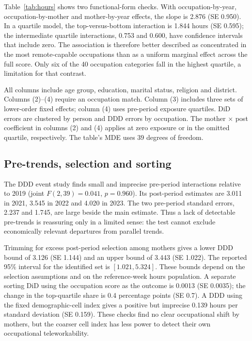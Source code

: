 \documentclass[12pt,a4paper]{article}
\begin{document}
Table~\ref{tab:hours} shows two functional-form checks. With occupation-by-year, occupation-by-mother and mother-by-year effects, the slope is 2.876 (SE 0.950). In a quartile model, the top-versus-bottom interaction is 1.844 hours (SE 0.595); the intermediate quartile interactions, 0.753 and 0.600, have confidence intervals that include zero. The association is therefore better described as concentrated in the most remote-capable occupations than as a uniform marginal effect across the full score. Only six of the 40 occupation categories fall in the highest quartile, a limitation for that contrast.

\begin{table}[htbp]\centering\begin{threeparttable}
\caption{Weekly-hours DiD and occupational-exposure DDD}\label{tab:hours}
\renewcommand{\baselinestretch}{1}\scriptsize\setlength{\tabcolsep}{3pt}

\begin{tablenotes}\footnotesize\item All columns include age group, education, marital status, religion and district. Columns (2)--(4) require an occupation match. Column (3) includes three sets of lower-order fixed effects; column (4) uses pre-period exposure quartiles. DiD errors are clustered by person and DDD errors by occupation. The mother $\times$ post coefficient in columns (2) and (4) applies at zero exposure or in the omitted quartile, respectively. The table's MDE uses 39 degrees of freedom. \autonoteHours\end{tablenotes}
\end{threeparttable}\end{table}

\subsection{Pre-trends, selection and sorting}\label{sec:diagnostics-results}
The DDD event study finds small and imprecise pre-period interactions relative to 2019 (joint $F(2,39)=0.041$, $p=0.960$). Its post-period estimates are 3.011 in 2021, 3.545 in 2022 and 4.020 in 2023. The two pre-period standard errors, 2.237 and 1.745, are large beside the main estimate. Thus a lack of detectable pre-trends is reassuring only in a limited sense: the test cannot exclude economically relevant departures from parallel trends.

Trimming for excess post-period selection among mothers gives a lower DDD bound of 3.126 (SE 1.144) and an upper bound of 3.443 (SE 1.022). The reported 95\% interval for the identified set is $[1.021,5.324]$. These bounds depend on the selection assumptions and on the reference-week hours population. A separate sorting DiD using the occupation score as the outcome is 0.0013 (SE 0.0035); the change in the top-quartile share is 0.4 percentage points (SE 0.7). A DDD using the fixed demographic-cell index gives a positive but imprecise 0.139 hours per standard deviation (SE 0.159). These checks find no clear occupational shift by mothers, but the coarser cell index has less power to detect their own occupational teleworkability.
\end{document}
